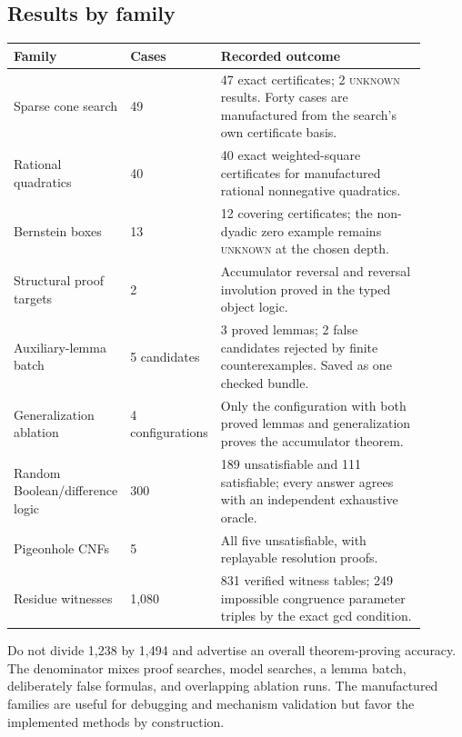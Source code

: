 \documentclass[11pt,letterpaper]{article}
\newcommand{\Unknown}{\textsc{unknown}}
\theoremstyle{definition}\newtheorem{definition}[theorem]{Definition}
\theoremstyle{remark}\newtheorem{remark}[theorem]{Remark}
\begin{document}
\subsection{Results by family}
\begin{longtable}{P{0.27\linewidth}P{0.12\linewidth}P{0.51\linewidth}}
\toprule
Family & Cases & Recorded outcome \\
\midrule\endhead
Sparse cone search & 49 & 47 exact certificates; 2 \Unknown{} results. Forty cases are manufactured from the search's own certificate basis. \\
Rational quadratics & 40 & 40 exact weighted-square certificates for manufactured rational nonnegative quadratics. \\
Bernstein boxes & 13 & 12 covering certificates; the non-dyadic zero example remains \Unknown{} at the chosen depth. \\
Structural proof targets & 2 & Accumulator reversal and reversal involution proved in the typed object logic. \\
Auxiliary-lemma batch & 5 candidates & 3 proved lemmas; 2 false candidates rejected by finite counterexamples. Saved as one checked bundle. \\
Generalization ablation & 4 configurations & Only the configuration with both proved lemmas and generalization proves the accumulator theorem. \\
Random Boolean/difference logic & 300 & 189 unsatisfiable and 111 satisfiable; every answer agrees with an independent exhaustive oracle. \\
Pigeonhole CNFs & 5 & All five unsatisfiable, with replayable resolution proofs. \\
Residue witnesses & 1,080 & 831 verified witness tables; 249 impossible congruence parameter triples by the exact gcd condition. \\
\bottomrule
\end{longtable}
Do not divide 1,238 by 1,494 and advertise an overall theorem-proving accuracy. The denominator mixes proof searches, model searches, a lemma batch, deliberately false formulas, and overlapping ablation runs. The manufactured families are useful for debugging and mechanism validation but favor the implemented methods by construction.
\end{document}
